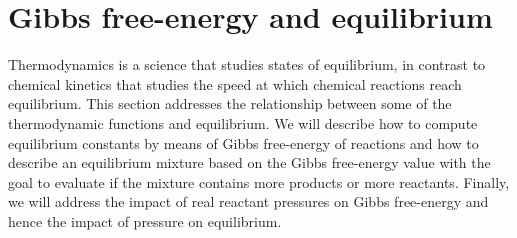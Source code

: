 \documentclass[main.tex]{subfiles}
\begin{document}
\section{Gibbs free-energy and equilibrium}
Thermodynamics is a science that studies states of equilibrium, in contrast to chemical kinetics that studies the speed at which chemical reactions reach equilibrium. This section addresses the relationship between some of the thermodynamic functions and equilibrium. We will describe how to compute equilibrium constants by means of Gibbs free-energy of reactions and how to describe an equilibrium mixture based on the Gibbs free-energy value with the goal to evaluate if the mixture contains more products or more reactants. Finally, we will address the impact of real reactant pressures on Gibbs free-energy and hence the impact of pressure on equilibrium.
\sloppy
\end{document}
